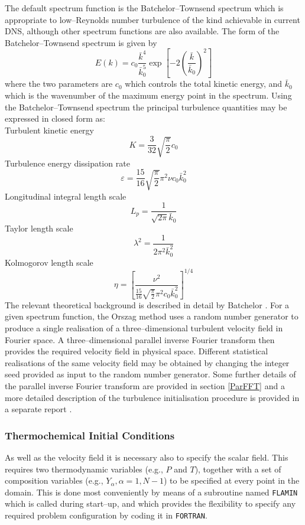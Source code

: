 \documentclass[dvips]{article}
\begin{document}
The default spectrum function is the Batchelor--Townsend spectrum
\cite{BatchelorTownsend} which is appropriate to low--Reynolds number
turbulence of the kind achievable in current DNS, although other
spectrum functions are also available.  The form of the
Batchelor--Townsend spectrum is given by
\begin{equation}
E(k) =
c_{0}\frac{\bar{k}^{4}}{\bar{k}_{0}^{5}}
\exp{\left[ -2\left(\frac{\bar{k}}{\bar{k}_{0}}\right)^{2}\right]}
\end{equation}
where the two parameters are $c_{0}$ which controls the total kinetic
energy, and $\bar{k}_{0}$ which is the wavenumber of the maximum energy
point in the spectrum.  Using the Batchelor--Townsend spectrum the
principal turbulence quantities may be expressed in closed form as:\\[1mm]
Turbulent kinetic energy
\[
K = \frac{3}{32}\sqrt{\frac{\pi}{2}}c_{0}
\]
Turbulence energy dissipation rate
\[
\varepsilon = \frac{15}{16}\sqrt{\frac{\pi}{2}}\pi^{2}\nu c_{0}\bar{k}_{0}^{2}
\]
Longitudinal integral length scale
\[
L_{p} = \frac{1}{\sqrt{2\pi}\bar{k}_{0}}
\]
Taylor length scale
\[
\lambda^{2} = \frac{1}{2\pi^{2}\bar{k}_{0}^{2}}
\]
Kolmogorov length scale
\[
\eta = \left[
\frac{\nu^{2}}{\frac{15}{16}\sqrt{\frac{\pi}{2}}\pi^{2} c_{0} \bar{k}_{0}^{2}}
\right]^{1/4}
\]
The relevant theoretical background is described in detail by Batchelor
\cite{Batchelor53}.
For a given spectrum function, the Orszag method uses a
random number generator to produce a single realisation of a
three--dimensional turbulent velocity field in Fourier space.  A
three--dimensional parallel inverse Fourier transform then provides the
required velocity field in physical space.  Different statistical
realisations of the same velocity
field may be obtained by changing the integer seed provided as input to the
random number generator.
Some further details of the parallel inverse Fourier transform are
provided in section \ref{ParFFT} and a more detailed description of the
turbulence initialisation procedure is provided in a separate
report \cite{Starturb}.

\subsubsection{Thermochemical Initial Conditions}
As well as the velocity field it is necessary also to specify the scalar
field.  This requires two thermodynamic variables (e.g., $P$ and $T$),
together with a set of composition variables (e.g., $Y_{\alpha},
\alpha=1, N-1$) to be specified at every point in the domain.  This is
done most conveniently by means of a subroutine named {\tt FLAMIN} which is
called during start--up, and which provides the flexibility to specify
any required problem configuration by coding it in {\tt FORTRAN}.
\end{document}
